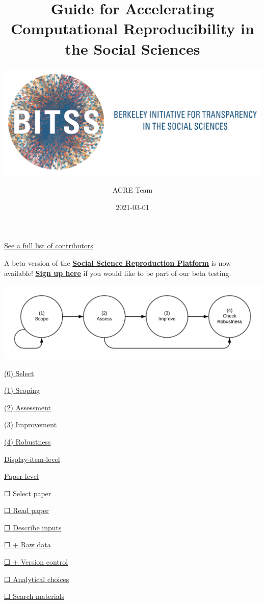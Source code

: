\documentclass[
]{book}
\title{Guide for Accelerating Computational Reproducibility in the Social Sciences}
\subtitle{\href{https://www.bitss.org/}{\includegraphics{BITSS_logo_horizontal.png}}}
\author{ACRE Team}
\date{2021-03-01}
\begin{document}
\maketitle

{
\setcounter{tocdepth}{1}
\tableofcontents
}
\hypertarget{section}{%
\chapter*{}\label{section}}

\protect\hyperlink{contributions}{See a full list of contributors}

A beta version of the \href{https://www.socialsciencereproduction.org/}{\textbf{Social Science Reproduction Platform}} is now available! \href{https://forms.gle/yZivWcwijCzEhrBU6}{\textbf{Sign up here}} if you would like to be part of our beta testing.

\includegraphics[width=1\linewidth]{stages}

\protect\hyperlink{scoping}{(0) Select}

\protect\hyperlink{scoping}{(1) Scoping}

\protect\hyperlink{assessment}{(2) Assessment}

\protect\hyperlink{improvements}{(3) Improvement}

\protect\hyperlink{robust}{(4) Robustness}

\protect\hyperlink{di-imp}{Display-item-level}

\protect\hyperlink{paper-level}{Paper-level}

☐ Select paper

\protect\hyperlink{read-summ}{☐ Read paper}

\protect\hyperlink{describe-inputs}{☐ Describe inputs}

\protect\hyperlink{rd}{☐ + Raw data}

\protect\hyperlink{paper-level}{☐ + Version control}

\protect\hyperlink{id-analy}{☐ Analytical choices}

\protect\hyperlink{check-acre}{☐ Search materials}
\end{document}
